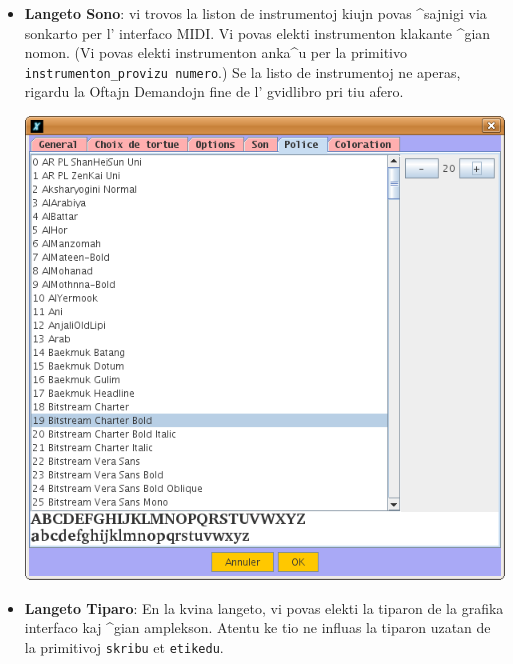 \begin{itemize}
\begin{itemize}
\begin{center}
    \end{center}
    \vspace{0.25cm}
  \item \textbf{Langeto Sono}: vi trovos la liston de instrumentoj
    kiujn povas ^sajnigi via sonkarto per l' interfaco MIDI.  Vi povas
    elekti instrumenton klakante ^gian nomon.  (Vi povas elekti
    instrumenton anka^u per la primitivo \texttt{instrumenton\_provizu
      numero}.)  Se la listo de instrumentoj ne aperas, rigardu la
    Oftajn Demandojn fine de l' gvidlibro pri tiu afero.
    \begin{center}
      \includegraphics[scale=0.4]{bildoj/CapturePref5.png}
    \end{center}
    \vspace{0.25cm}
  \item \textbf{Langeto Tiparo}: En la kvina langeto, vi povas elekti
    la tiparon de la grafika interfaco kaj ^gian amplekson.  Atentu ke
    tio ne influas la tiparon uzatan de la primitivoj \texttt{skribu}
    et \texttt{etikedu}.
    \begin{center}

\end{center}
\end{itemize}
\end{itemize}
